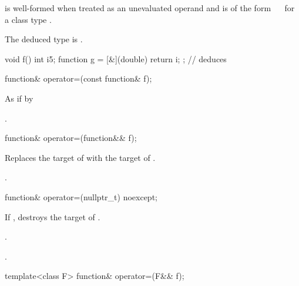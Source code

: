 \begin{itemdescr}
\pnum
\constraints
{} is well-formed when treated as an unevaluated operand and
 is of the form
~\cv{}~
for a class type .

\pnum
\remarks
The deduced type is .

\pnum
\begin{example}
\begin{codeblock}
void f() {
  int i{5};
  function g = [&](double) { return i; };       // deduces 
}
\end{codeblock}
\end{example}
\end{itemdescr}

%
\begin{itemdecl}
function& operator=(const function& f);
\end{itemdecl}

\begin{itemdescr}
\pnum
\effects
As if by 

\pnum
\returns
{}.
\end{itemdescr}

%
\begin{itemdecl}
function& operator=(function&& f);
\end{itemdecl}

\begin{itemdescr}
\pnum
\effects
Replaces the target of 
with the target of .

\pnum
\returns
{}.
\end{itemdescr}

%
\begin{itemdecl}
function& operator=(nullptr_t) noexcept;
\end{itemdecl}

\begin{itemdescr}
\pnum
\effects
If , destroys the target of .

\pnum
\ensures
{}.

\pnum
\returns
{}.
\end{itemdescr}

%
\begin{itemdecl}
template<class F> function& operator=(F&& f);
\end{itemdecl}

